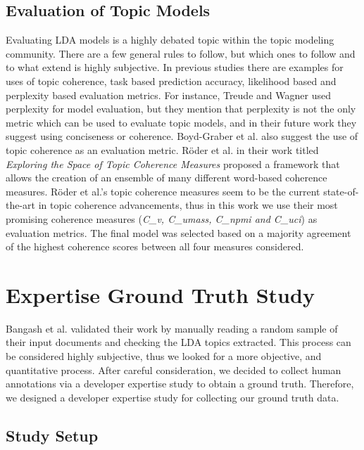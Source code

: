     \subsection{Evaluation of Topic Models} \label{evaluationMetric}
    
        Evaluating LDA models is a highly debated topic within the topic modeling community. There are a few general rules to follow, but which ones to follow and to what extend is highly subjective. In previous studies there are examples for uses of topic coherence, task based prediction accuracy, likelihood based and perplexity based evaluation metrics. For instance, Treude and Wagner \cite{treude2019predicting} used perplexity for model evaluation, but they mention that perplexity is not the only metric which can be used to evaluate topic models, and in their future work they suggest using conciseness or coherence. Boyd-Graber et al. \cite{boyd2014care} also suggest the use of topic coherence as an evaluation metric. R{\"o}der et al. \cite{roder2015exploring} in their work titled \textit{Exploring the Space of Topic Coherence Measures} proposed a framework that allows the creation of an ensemble of many different word-based coherence measures. R{\"o}der et al.'s topic coherence measures seem to be the current state-of-the-art in topic coherence advancements, thus in this work we use their most promising coherence measures (\emph{C\_v, C\_umass, C\_npmi and C\_uci}) as evaluation metrics. The final model was selected based on a majority agreement of the highest coherence scores between all four measures considered.
    
    \section{Expertise Ground Truth Study} \label{sec:expertise_survey}
    
        Bangash et al. \cite{bangash2019developers} validated their work by manually reading a random sample of their input documents and checking the LDA topics extracted. This process can be considered highly subjective, thus we looked for a more objective, and quantitative process. After careful consideration, we decided to collect human annotations via a developer expertise study to obtain a ground truth. Therefore, we designed a developer expertise study for collecting our ground truth data. 
    
        \subsection{Study Setup}
        
